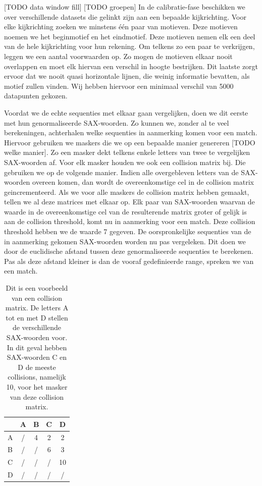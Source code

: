 \documentclass{article}
\begin{document}
[TODO data window fill]
[TODO groepen]
In de calibratie-fase beschikken we over verschillende datasets die gelinkt zijn aan een bepaalde kijkrichting. Voor elke kijkrichting zoeken we minstens één paar van motieven. Deze motieven noemen we het beginmotief en het eindmotief. Deze motieven nemen elk een deel van de hele kijkrichting voor hun rekening. Om telkens zo een paar te verkrijgen, leggen we een aantal voorwaarden op. Zo mogen de motieven elkaar nooit overlappen en moet elk hiervan een verschil in hoogte bestrijken. Dit laatste zorgt ervoor dat we nooit quasi horizontale lijnen, die weinig informatie bevatten, als motief zullen vinden. Wij hebben hiervoor een minimaal verschil van 5000 datapunten gekozen.

Voordat we de echte sequenties met elkaar gaan vergelijken, doen we dit eerste met hun genormaliseerde SAX-woorden. Zo kunnen we, zonder al te veel berekeningen, achterhalen welke sequenties in aanmerking komen voor een match. Hiervoor gebruiken we maskers die we op een bepaalde manier genereren [TODO welke manier]. Zo een masker dekt telkens enkele letters van twee te vergelijken SAX-woorden af. Voor elk masker houden we ook een collision matrix bij. Die gebruiken we op de volgende manier. Indien alle overgebleven letters van de SAX-woorden overeen komen, dan wordt de overeenkomstige cel in de collision matrix geincrementeerd. Als we voor alle maskers de collision matrix hebben gemaakt, tellen we al deze matrices met elkaar op. Elk paar van SAX-woorden waarvan de waarde in de overeenkomstige cel van de resulterende matrix groter of gelijk is aan de collision threshold, komt nu in aanmerking voor een match. Deze collision threshold hebben we de waarde 7 gegeven. De oorspronkelijke sequenties van de in aanmerking gekomen SAX-woorden worden nu pas vergeleken. Dit doen we door de euclidische afstand tussen deze genormaliseerde sequenties te berekenen. Pas als deze afstand kleiner is dan de vooraf gedefinieerde range, spreken we van een match.

\begin{table}
\caption{Dit is een voorbeeld van een collision matrix. De letters A tot en met D stellen de verschillende SAX-woorden voor. In dit geval hebben SAX-woorden C en D de meeste collisions, namelijk 10, voor het masker van deze collision matrix.}
\centering
\begin{tabular}{ l || c | c | c | c }
& A & B & C & D \\ \hline
\hline
A & / & 4 & 2 & 2 \\ \hline
B & / & / & 6 & 3 \\ \hline
C & / & / & / & 10\\ \hline
D & / & / & / & / \\
\hline
\end{tabular}\par
\end{table}
\end{document}
